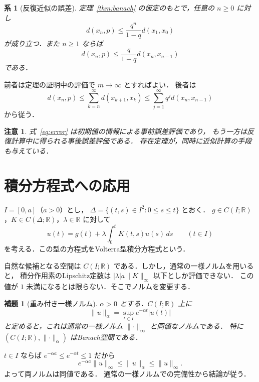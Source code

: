 \documentclass[a5paper,10pt,onecolumn]{jsarticle}
\makeatletter
\theoremstyle{mathnotetheorem}
\newtheorem{lemma}[theorem]{補題}
\newtheorem{corollary}[theorem]{系}
\newtheorem{remark}[theorem]{注意}
\renewcommand{\proofname}{証明}
\renewenvironment{proof}[1][\proofname]{%
  \par\pushQED{\qed}\normalfont\topsep4\p@\@plus2\p@\relax
  \trivlist\item[\hskip\labelsep\bfseries #1]\ignorespaces
}{\popQED\endtrivlist\@endpefalse}
\newcommand{\R}{\mathbb{R}}
\newcommand{\norm}[1]{\lVert #1\rVert}
\newcommand{\abs}[1]{\lvert #1\rvert}
\makeatother
\begin{document}
\begin{corollary}[反復近似の誤差]\label{cor:error}
定理~\ref{thm:banach} の仮定のもとで，任意の $n\ge0$ に対し
\begin{equation}\label{eq:error}
 d(x_n,p)\le\frac{q^n}{1-q}d(x_1,x_0)
\end{equation}
が成り立つ．また $n\ge1$ ならば
\[
 d(x_n,p)\le\frac{q}{1-q}d(x_n,x_{n-1})
\]
である．
\end{corollary}

\begin{proof}
前者は定理の証明中の評価で $m\to\infty$ とすればよい．
後者は
\[
 d(x_n,p)\le \sum_{k=n}^{\infty}d(x_{k+1},x_k)
  \le \sum_{j=1}^{\infty}q^j d(x_n,x_{n-1})
\]
から従う．
\end{proof}

\begin{remark}
式~\eqref{eq:error} は初期値の情報による\emph{事前誤差評価}であり，
もう一方は反復計算中に得られる\emph{事後誤差評価}である．
存在定理が，同時に近似計算の手段も与えている．
\end{remark}

\section{積分方程式への応用}

$I=[0,a]$（$a>0$）とし，
$\Delta=\{(t,s)\in I^2:0\le s\le t\}$ とおく．
$g\in C(I;\R)$，$K\in C(\Delta;\R)$，$\lambda\in\R$ に対して
\begin{equation}\label{eq:volterra}
 u(t)=g(t)+\lambda\int_0^t K(t,s)u(s)\,ds
 \qquad(t\in I)
\end{equation}
を考える．この型の方程式をVolterra型積分方程式という．

自然な候補となる空間は $C(I;\R)$ である．しかし，通常の一様ノルムを用いると，
積分作用素のLipschitz定数は $\abs{\lambda}a\norm{K}_{\infty}$ 以下としか評価できない．
この値が $1$ 未満になるとは限らない．そこでノルムを変更する．

\begin{lemma}[重み付き一様ノルム]\label{lem:weight}
$\alpha>0$ とする．$C(I;\R)$ 上に
\[
 \norm{u}_{\alpha}=\sup_{t\in I}e^{-\alpha t}\abs{u(t)}
\]
と定めると，これは通常の一様ノルム $\norm{\cdot}_{\infty}$ と同値なノルムである．
特に $(C(I;\R),\norm{\cdot}_{\alpha})$ はBanach空間である．
\end{lemma}

\begin{proof}
$t\in I$ ならば $e^{-\alpha a}\le e^{-\alpha t}\le1$ だから
\[
 e^{-\alpha a}\norm{u}_{\infty}\le\norm{u}_{\alpha}
 \le\norm{u}_{\infty}.
\]
よって両ノルムは同値である．
通常の一様ノルムでの完備性から結論が従う．
\end{proof}
\end{document}
